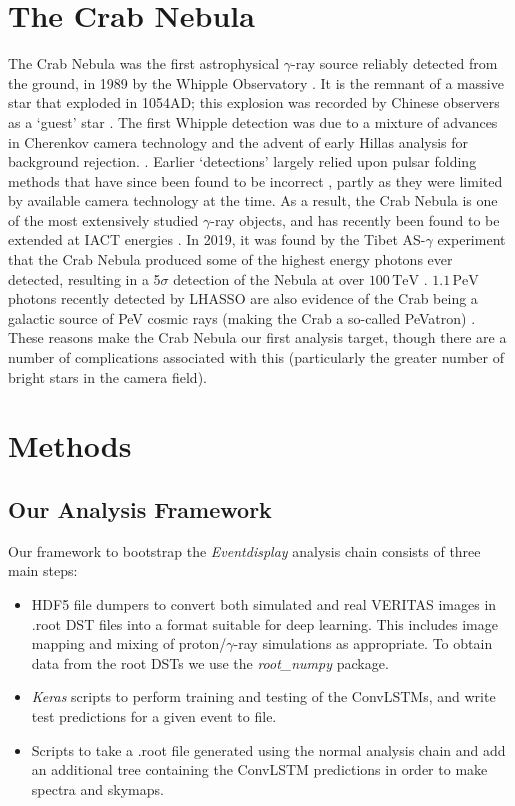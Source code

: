 \section{The Crab Nebula}
The Crab Nebula was the first astrophysical $\gamma$-ray source reliably detected from the ground, in 1989 by the Whipple Observatory \cite{weekestev}. It is the remnant of a massive star that exploded in 1054AD; this explosion was recorded by Chinese observers as a `guest' star \cite{lhassocrab}. The first Whipple detection was due to a mixture of advances in Cherenkov camera technology and the advent of early Hillas analysis for background rejection. \cite{hillasparams}. Earlier `detections' largely relied upon pulsar folding methods that have since been found to be incorrect \cite{paulathesis}, partly as they were limited by available camera technology at the time. As a result, the Crab Nebula is one of the most extensively studied $\gamma$-ray objects, and has recently been found to be extended at IACT energies \cite{holler}. In 2019, it was found by the Tibet AS-$\gamma$ experiment that the Crab Nebula produced some of the highest energy photons ever detected, resulting in a 5$\sigma$ detection of the Nebula at over $\mathrm{100\,TeV}$ \cite{asgamma}. $\mathrm{1.1\,PeV}$ photons recently detected by LHASSO are also evidence of the Crab being a galactic source of PeV cosmic rays (making the Crab a so-called PeVatron) \cite{lhassocrab}. These reasons make the Crab Nebula our first analysis target, though there are a number of complications associated with this (particularly the greater number of bright stars in the camera field).

\section{Methods}
\subsection{Our Analysis Framework}
Our framework to bootstrap the \textit{Eventdisplay} analysis chain consists of three main steps:

\begin{itemize}
    \item HDF5 file dumpers to convert both simulated and real VERITAS images in .root DST files into a format suitable for deep learning. This includes image mapping and mixing of proton/$\gamma$-ray simulations as appropriate. To obtain data from the root DSTs we use the \textit{root\_numpy} \cite{rootnumpy} package.
    \item \textit{Keras} scripts to perform training and testing of the ConvLSTMs, and write test predictions for a given event to file.
    \item Scripts to take a .root file generated using the normal analysis chain and add an additional tree containing the ConvLSTM predictions in order to make spectra and skymaps.
\end{itemize}

